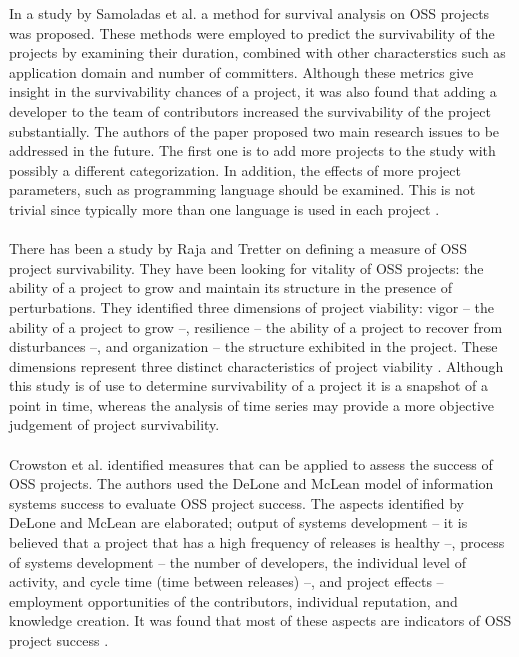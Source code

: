 In a study by Samoladas et al. a method for survival analysis on OSS projects
was proposed. These methods were employed to predict the
survivability of the projects by examining their duration, combined with other
characterstics such as application domain and number of committers. Although
these metrics give insight in the survivability chances of a project, it was
also found that adding a developer to the team of contributors increased the
survivability of the project substantially. The authors of the paper proposed
two main research issues to be addressed in the future. The first one is to add
more projects to the study with possibly a different categorization. In
addition, the effects of more project parameters, such as programming language
should be examined. This is not trivial since typically more than one language
is used in each project \cite{samoladas2010}.

\paragraph{}
There has been a study by Raja and Tretter on defining a measure of OSS project
survivability. They have been looking for vitality of OSS projects: the ability
of a project to grow and maintain its structure in the presence of
perturbations. They identified three dimensions of project viability: vigor --
the ability of a project to grow --, resilience -- the ability of a project to
recover from disturbances --, and organization -- the structure exhibited in the
project. These dimensions represent three distinct characteristics of project
viability \cite{raja2012}. Although this study is of use to determine
survivability of a project it is a snapshot of a point in time, whereas the
analysis of time series may provide a more objective judgement of project
survivability.

\paragraph{}
Crowston et al. identified measures that can be applied to assess the success of
OSS projects. The authors used the DeLone and McLean model of information
systems success to evaluate OSS project success. The aspects identified by
DeLone and McLean are elaborated; output of systems development -- it is
believed that a project that has a high frequency of releases is healthy --,
process of systems development -- the number of developers, the individual
level of activity, and cycle time (time between releases) --, and
project effects -- employment opportunities of the contributors, individual
reputation, and knowledge creation. It was found that most of these aspects are
indicators of OSS project success \cite{crowston2003}.

